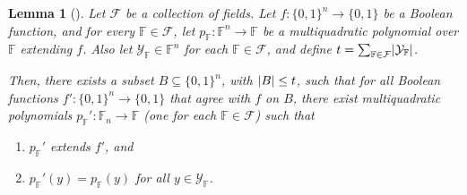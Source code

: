 \documentclass[english]{reedthesis}
\theoremstyle{plain}
\newtheorem{lemma}[lemma]{Lemma}
\theoremstyle{definition}
\theoremstyle{remark}
\DeclarePairedDelimiter{\abs}{\lvert}{\rvert}
\begin{document}
\begin{lemma}[{\cite[Lemma 4.5]{AW09}}]\label{lem:multiquad-adversary}
  Let $\mathcal{F}$ be a collection of fields. Let $f: \{0, 1\}^{n} \rightarrow \{0, 1\}$ be a
  Boolean function, and for every $\mathbb{F} \in \mathcal{F}$, let
  $p_{\mathbb{F}}: \mathbb{F}^{n} \rightarrow \mathbb{F}$ be a multiquadratic polynomial
  over $\mathbb{F}$ extending $f$. Also let $\mathcal{Y}_{\mathbb{F}} \in \mathbb{F}^{n}$
  for each $\mathbb{F} \in \mathcal{F}$, and define
  $t = \sum_{\mathbb{F} \in \mathcal{F}}\abs{\mathcal{Y}_{\mathbb{F}}}$.

  Then, there exists a subset $B \subseteq \{0, 1\}^{n}$, with $\abs{B} \le t$, such that
  for all Boolean functions $f': \{0, 1\}^{n} \rightarrow \{0, 1\}$ that agree with $f$ on
  $B$, there exist multiquadratic polynomials
  $p_{\mathbb{F}}':\mathbb{F}_{n} \rightarrow \mathbb{F}$ (one for each $\mathbb{F} \in \mathcal{F}$)
  such that
  \begin{enumerate}
    \item $p_{\mathbb{F}}'$ extends $f'$, and
    \item $p_{\mathbb{F}}'(y) = p_{\mathbb{F}}(y)$ for all $y \in \mathcal{Y}_{\mathbb{F}}$.
  \end{enumerate}
\end{lemma}
\end{document}
